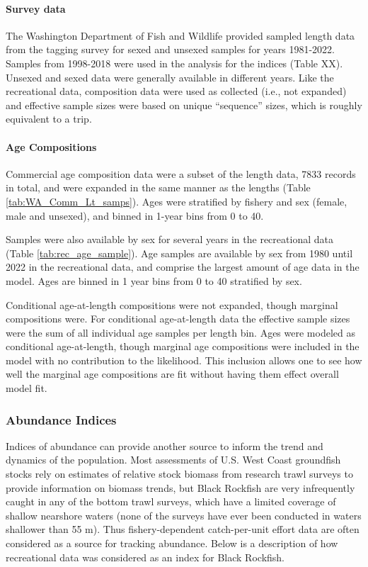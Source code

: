 \documentclass[11pt,
  english,
  letterpaper,
]{article}
\begin{document}
\hypertarget{survey-data}{%
\paragraph{Survey data}\label{survey-data}}

The Washington Department of Fish and Wildlife provided sampled length data from the tagging survey for sexed and unsexed samples for years 1981-2022. Samples from 1998-2018 were used in the analysis for the indices (Table XX). Unsexed and sexed data were generally available in different years. Like the recreational data, composition data were used as collected (i.e., not expanded) and effective sample sizes were based on unique ``sequence'' sizes, which is roughly equivalent to a trip.

\hypertarget{age-compositions}{%
\paragraph{Age Compositions}\label{age-compositions}}

Commercial age composition data were a subset of the length data, 7833 records in total, and were expanded in the same manner as the lengths (Table \ref{tab:WA_Comm_Lt_samps}). Ages were stratified by fishery and sex (female, male and unsexed), and binned in 1-year bins from 0 to 40.

Samples were also available by sex for several years in the recreational data (Table \ref{tab:rec_age_sample}). Age samples are available by sex from 1980 until 2022 in the recreational data, and comprise the largest amount of age data in the model. Ages are binned in 1 year bins from 0 to 40 stratified by sex.

Conditional age-at-length compositions were not expanded, though marginal compositions were. For conditional age-at-length data the effective sample sizes were the sum of all individual age samples per length bin. Ages were modeled as conditional age-at-length, though marginal age compositions were included in the model with no contribution to the likelihood. This inclusion allows one to see how well the marginal age compositions are fit without having them effect overall model fit.

\hypertarget{abundance-indices}{%
\subsubsection{Abundance Indices}\label{abundance-indices}}

Indices of abundance can provide another source to inform the trend and dynamics of the population. Most assessments of U.S. West Coast groundfish stocks rely on estimates of relative stock biomass from research trawl surveys to provide information on biomass trends, but Black Rockfish are very infrequently caught in any of the bottom trawl surveys, which have a limited coverage of shallow nearshore waters (none of the surveys have ever been conducted in waters shallower than 55 m). Thus fishery-dependent catch-per-unit effort data are often considered as a source for tracking abundance. Below is a description of how recreational data was considered as an index for Black Rockfish.
\end{document}
